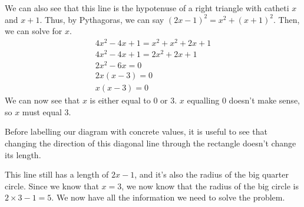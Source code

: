 \documentclass[a4paper]{article}
\begin{document}
We can also see that this line is the hypotenuse of a right triangle with catheti $x$ and $x + 1$. Thus, by Pythagoras, we can say $(2x - 1)^2 = x^2 + (x + 1)^2$. Then, we can solve for $x$.
\begin{gather*}
4x^2 - 4x + 1 = x^2 + x^2 + 2x + 1\\
4x^2 - 4x + 1 = 2x^2 + 2x + 1\\
2x^2 - 6x = 0\\
2x(x - 3) = 0\\
x(x - 3) = 0
\end{gather*}
We can now see that $x$ is either equal to 0 or 3. $x$ equalling 0 doesn't make sense, so $x$ must equal 3.

Before labelling our diagram with concrete values, it is useful to see that changing the direction of this diagonal line through the rectangle doesn't change its length.

\hspace{\fill}
\hspace{\fill}

This line still has a length of $2x - 1$, and it's also the radius of the big quarter circle. Since we know that $x = 3$, we now know that the radius of the big circle is $2 \times 3 - 1 = 5$. We now have all the information we need to solve the problem.

\hspace{\fill}
\hspace{\fill}
\end{document}
